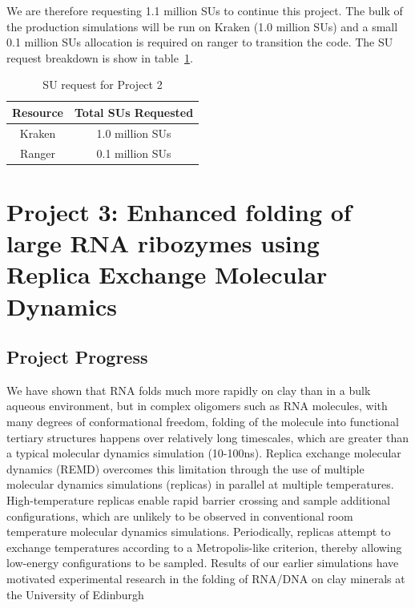 \documentclass[a4paper,11pt]{article}
\newcommand{\up}{\vspace*{-1em}}
\begin{document}
We are therefore requesting 1.1 million SUs to continue this project. The bulk of the production simulations will be run on Kraken (1.0 million SUs) and a small 0.1 million SUs allocation is required on ranger to transition the code. The SU request breakdown is show in table~\ref{table:project22}.

\begin{table}[!h]
\begin{center}
\begin{tabular}{|c|c| }
\hline 
Resource & Total SUs Requested \\ 
\hline
Kraken   & 1.0 million SUs \\
\hline
Ranger   & 0.1 million SUs \\
\hline
\end{tabular}
\end{center}
  \caption{SU request for Project 2}\label{table:project22}
\up
\end{table}




\section{Project 3: Enhanced folding of large RNA ribozymes using Replica Exchange Molecular Dynamics}

\subsection{Project Progress}

We have shown that RNA folds much more rapidly on clay than in a bulk aqueous environment,
but in complex oligomers such as RNA molecules, with many degrees of conformational freedom, folding of the molecule into functional tertiary structures happens over relatively long timescales, which are greater than a typical molecular dynamics simulation (10-100ns). Replica exchange molecular dynamics (REMD) overcomes this limitation through the use of multiple molecular dynamics simulations (replicas) in parallel at multiple temperatures. High-temperature replicas enable rapid barrier crossing and sample additional configurations, which are unlikely to be observed in conventional room temperature molecular dynamics simulations. Periodically, replicas attempt to exchange temperatures according to a Metropolis-like criterion, thereby allowing low-energy configurations to be sampled. Results of our earlier simulations have motivated experimental research in the folding of RNA/DNA on clay minerals at the University of Edinburgh
\end{document}

